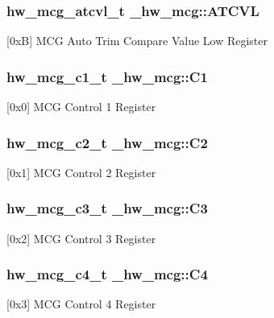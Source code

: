 \subsubsection[{\texorpdfstring{A\+T\+C\+VL}{ATCVL}}]{ {\bf hw\+\_\+mcg\+\_\+atcvl\+\_\+t} \+\_\+hw\+\_\+mcg\+::\+A\+T\+C\+VL}\hypertarget{struct__hw__mcg_ad4ada20faa1096979657af99f68b0040}{}\label{struct__hw__mcg_ad4ada20faa1096979657af99f68b0040}
\mbox{[}0xB\mbox{]} M\+CG Auto Trim Compare Value Low Register 
\subsubsection[{\texorpdfstring{C1}{C1}}]{ {\bf hw\+\_\+mcg\+\_\+c1\+\_\+t} \+\_\+hw\+\_\+mcg\+::\+C1}\hypertarget{struct__hw__mcg_adf43bb2b6727cf97377d741c8312d870}{}\label{struct__hw__mcg_adf43bb2b6727cf97377d741c8312d870}
\mbox{[}0x0\mbox{]} M\+CG Control 1 Register 
\subsubsection[{\texorpdfstring{C2}{C2}}]{ {\bf hw\+\_\+mcg\+\_\+c2\+\_\+t} \+\_\+hw\+\_\+mcg\+::\+C2}\hypertarget{struct__hw__mcg_a129f106327e63fd0bef6a06045ee2b46}{}\label{struct__hw__mcg_a129f106327e63fd0bef6a06045ee2b46}
\mbox{[}0x1\mbox{]} M\+CG Control 2 Register 
\subsubsection[{\texorpdfstring{C3}{C3}}]{ {\bf hw\+\_\+mcg\+\_\+c3\+\_\+t} \+\_\+hw\+\_\+mcg\+::\+C3}\hypertarget{struct__hw__mcg_a21f69fb0895c94930c5a54ecca21f356}{}\label{struct__hw__mcg_a21f69fb0895c94930c5a54ecca21f356}
\mbox{[}0x2\mbox{]} M\+CG Control 3 Register 
\subsubsection[{\texorpdfstring{C4}{C4}}]{ {\bf hw\+\_\+mcg\+\_\+c4\+\_\+t} \+\_\+hw\+\_\+mcg\+::\+C4}\hypertarget{struct__hw__mcg_acb225f0712236376a4ac3c114608cc97}{}\label{struct__hw__mcg_acb225f0712236376a4ac3c114608cc97}
\mbox{[}0x3\mbox{]} M\+CG Control 4 Register 
